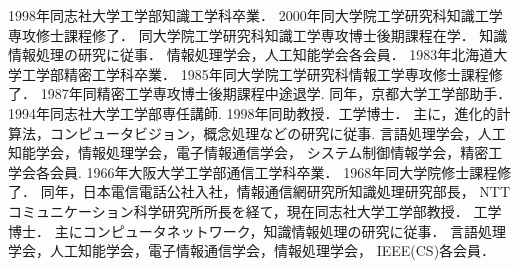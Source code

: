\begin{biography}
{
1998年同志社大学工学部知識工学科卒業．
2000年同大学院工学研究科知識工学専攻修士課程修了．
同大学院工学研究科知識工学専攻博士後期課程在学．
知識情報処理の研究に従事．
情報処理学会，人工知能学会各会員．
}
{
1983年北海道大学工学部精密工学科卒業．
1985年同大学院工学研究科情報工学専攻修士課程修了．        
1987年同精密工学専攻博士後期課程中途退学. 
同年，京都大学工学部助手．
1994年同志社大学工学部専任講師.
1998年同助教授．工学博士．
主に，進化的計算法，コンピュータビジョン，概念処理などの研究に従事.
言語処理学会，人工知能学会，情報処理学会，電子情報通信学会，
システム制御情報学会，精密工学会各会員.
}
{
1966年大阪大学工学部通信工学科卒業．
1968年同大学院修士課程修了．
同年，日本電信電話公社入社，情報通信網研究所知識処理研究部長，
NTTコミュニケーション科学研究所所長を経て，現在同志社大学工学部教授．
工学博士．
主にコンピュータネットワーク，知識情報処理の研究に従事．
言語処理学会，人工知能学会，電子情報通信学会，情報処理学会，
IEEE(CS)各会員．
}


\end{biography}

